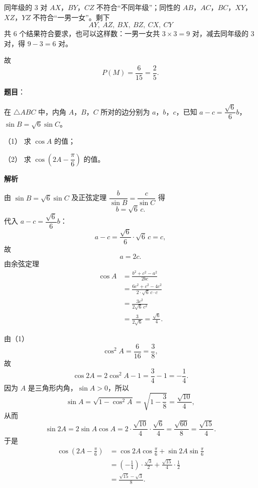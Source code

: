 \begin{answer}
同年级的 $3$ 对 $AX$，$BY$，$CZ$ 不符合“不同年级”；同性的 $AB$，$AC$，$BC$，$XY$，$XZ$，$YZ$ 不符合“一男一女”。剩下
\nopagebreak[4]
\[AY,\ AZ,\ BX,\ BZ,\ CX,\ CY\]
共 $6$ 个结果符合要求，也可以这样数：一男一女共 $3\times3=9$ 对，减去同年级的 $3$ 对，得 $9-3=6$ 对。

故
\nopagebreak[4]
\[P(M)=\frac{6}{15}=\frac25.\]



\end{answer}
\begin{answer}

\textbf{题目}：

在 $\triangle ABC$ 中，内角 $A$，$B$，$C$ 所对的边分别为 $a$，$b$，$c$，已知 $a-c=\dfrac{\sqrt6}{6}b$，$\sin B=\sqrt6\sin C$。

（1） 求 $\cos A$ 的值；

（2） 求 $\cos\left(2A-\dfrac\pi6\right)$ 的值。

\textbf{解析}


由 $\sin B=\sqrt6\sin C$ 及正弦定理 $\dfrac{b}{\sin B}=\dfrac{c}{\sin C}$ 得
\nopagebreak[4]
\[b=\sqrt6\,c.\]
代入 $a-c=\dfrac{\sqrt6}{6}b$：
\nopagebreak[4]
\[a-c=\frac{\sqrt6}{6}\cdot\sqrt6\,c=c,\]
故
\nopagebreak[4]
\[a=2c.\]
由余弦定理
\nopagebreak[4]
\[\begin{aligned}
\cos A&=\frac{b^2+c^2-a^2}{2bc}\\
&=\frac{6c^2+c^2-4c^2}{2\cdot\sqrt6\,c\cdot c}\\
&=\frac{3c^2}{2\sqrt6\,c^2}\\
&=\frac{3}{2\sqrt6}=\frac{\sqrt6}{4}.
\end{aligned}\]


由（1）
\nopagebreak[4]
\[\cos^2A=\frac{6}{16}=\frac38,\]
故
\nopagebreak[4]
\[\cos2A=2\cos^2A-1=\frac34-1=-\frac14.\]
因为 $A$ 是三角形内角，$\sin A>0$，所以
\nopagebreak[4]
\[\sin A=\sqrt{1-\cos^2A}=\sqrt{1-\frac38}=\frac{\sqrt{10}}{4},\]
从而
\nopagebreak[4]
\[\sin2A=2\sin A\cos A=2\cdot\frac{\sqrt{10}}{4}\cdot\frac{\sqrt6}{4}=\frac{\sqrt{60}}{8}=\frac{\sqrt{15}}{4}.\]
于是
\nopagebreak[4]
\[\begin{aligned}
\cos\left(2A-\frac\pi6\right)
&=\cos2A\cos\frac\pi6+\sin2A\sin\frac\pi6\\
&=\left(-\frac14\right)\cdot\frac{\sqrt3}{2}+\frac{\sqrt{15}}{4}\cdot\frac12\\
&=\frac{\sqrt{15}-\sqrt3}{8}.
\end{aligned}\]


\end{answer}
